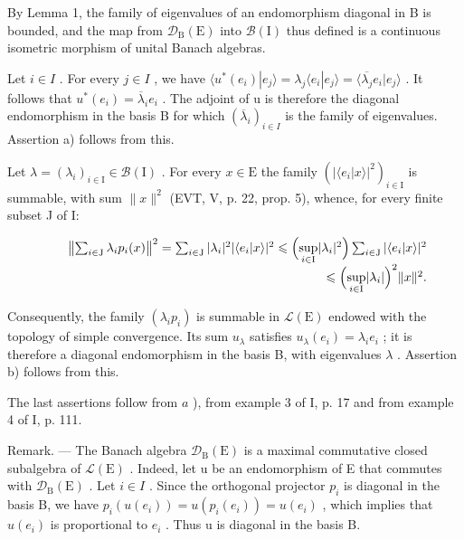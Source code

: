 By Lemma 1, the family of eigenvalues of an endomorphism diagonal in B is bounded, and the map from \(\mathcal{D}_{\mathrm{B}}(\mathrm{E})\) into \(\mathcal{B}(\mathrm{I})\) thus defined is a continuous isometric morphism of unital Banach algebras.

Let \(i \in I\) . For every \(j \in I\) , we have \(\langle u^{*}(e_{i}) | e_{j} \rangle = \lambda_{j} \langle e_{i} | e_{j} \rangle = \langle \overline{\lambda_{j}} e_{i} | e_{j} \rangle\) . It follows that \(u^{*}(e_{i}) = \overline{\lambda}_{i} e_{i}\) . The adjoint of u is therefore the diagonal endomorphism in the basis B for which \((\overline{\lambda}_{i})_{i \in I}\) is the family of eigenvalues. Assertion a) follows from this.

Let \(\lambda = (\lambda_i)_{i\in \mathrm{I}}\in \mathcal{B}(\mathrm{I})\) . For every \(x\in \mathrm{E}\) the family \((|\langle e_i|x\rangle |^2)_{i\in \mathrm{I}}\) is summable, with sum \(\| x\|^2\) (EVT, V, p. 22, prop. 5), whence, for every finite subset J of I:

\[
\begin{array}{r l r} & & {\left\| \sum_ {i \in \mathrm{J}} \lambda_ {i} p _ {i} (x) \right\| ^ {2} = \sum_ {i \in \mathrm{J}} | \lambda_ {i} | ^ {2} | \langle e _ {i} | x \rangle | ^ {2} \leqslant \Bigl (\underset {i \in \mathrm{I}} {\sup} | \lambda_ {i} | ^ {2} \Bigr) \sum_ {i \in \mathrm{J}} | \langle e _ {i} | x \rangle | ^ {2}} \\ & & {\leqslant \Bigl (\underset {i \in \mathrm{I}} {\sup} | \lambda_ {i} | \Bigr) ^ {2} \| x \| ^ {2}.} \end{array}
\]

Consequently, the family \((\lambda_{i}p_{i})\) is summable in \(\mathcal{L}(\mathrm{E})\) endowed with the topology of simple convergence. Its sum \(u_{\lambda}\) satisfies \(u_{\lambda}(e_{i}) = \lambda_{i}e_{i}\) ; it is therefore a diagonal endomorphism in the basis B, with eigenvalues \(\lambda\) . Assertion b) follows from this.

The last assertions follow from \(a\) ), from example 3 of I, p. 17 and from example 4 of I, p. 111.

Remark. --- The Banach algebra \(\mathcal{D}_{\mathrm{B}}(\mathrm{E})\) is a maximal commutative closed subalgebra of \(\mathcal{L}(\mathrm{E})\) . Indeed, let u be an endomorphism of E that commutes with \(\mathcal{D}_{\mathrm{B}}(\mathrm{E})\) . Let \(i \in I\) . Since the orthogonal projector \(p_{i}\) is diagonal in the basis B, we have \(p_{i}(u(e_{i})) = u(p_{i}(e_{i})) = u(e_{i})\) , which implies that \(u(e_{i})\) is proportional to \(e_{i}\) . Thus u is diagonal in the basis B.

